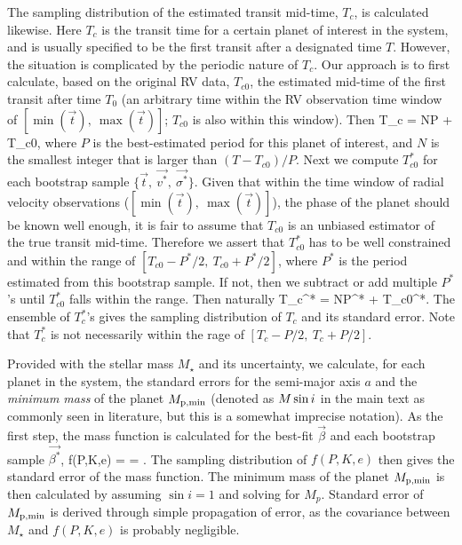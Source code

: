 The sampling distribution of the estimated transit mid-time, $T_c$, is
calculated likewise. Here $T_c$ is the transit time for a certain
planet of interest in the system, and is usually specified to be the first
transit after a designated time $T$.  However, the situation is
complicated by the periodic nature of $T_c$. Our approach is to first
calculate, based on the original RV data, $T_{c0}$, the estimated
mid-time of the first transit after time $T_0$ (an arbitrary time
within the RV observation time window of $[\min(\vec{t}),\ \max(\vec{t})]$; $T_{c0}$ 
is also within this window).
Then
\beq
T_c = N\cdot P + T_{c0},
\eeq
where $P$ is the best-estimated period for this planet of interest,
and $N$ is the smallest integer that is larger than $(T - T_{c0})/P$.
Next we compute $T_{c0}^*$ for each bootstrap sample $\lbrace
\vec{t},\ \vec{v^*},\ \vec{\sigma^*} \rbrace$. Given that within the
time window of radial velocity observations
($[\min(\vec{t}),\ \max(\vec{t})]$), the phase of the planet should be
known well enough, it is fair to assume that $T_{c0}$ is an unbiased
estimator of the true transit mid-time. Therefore we assert that
$T_{c0}^*$ has to be well constrained and within the range of
$[T_{c0}-P^*/2,\ T_{c0}+P^*/2]$, where $P^*$ is the period estimated from
this bootstrap sample. If not, then we subtract or add multiple
$P^*$'s until $T_{c0}^*$ falls within the range. Then naturally
\beq
T_c^* = N\cdot P^* + T_{c0}^*.
\eeq
The ensemble of $T_c^*$'s gives the sampling distribution of $T_c$
and its standard error. Note that $T_c^*$ is not necessarily within
the rage of $[T_{c}-P/2,\ T_{c}+P/2]$.

Provided with the stellar mass $M_\star$ and its uncertainty, we
calculate, for each planet in the system, the standard errors for the
semi-major axis $a$ and the {\it minimum mass} of the planet $M_{\rm
  p,min}$ (denoted as $M\sin{i}$ in the main text as commonly seen in
literature, but this is a somewhat imprecise notation). As the first
step, the mass function is calculated for the best-fit $\vec{\beta}$
and each bootstrap sample $\vec{\beta^*}$,
\beq
f(P,K,e) =  = .
\eeq
The sampling distribution of $f(P,K,e)$ then gives the standard error
of the mass function. The minimum mass of the planet $M_{\rm p,min}$ 
is then calculated by assuming $\sin{i}=1$ and solving for $M_p$.
Standard error of $M_{\rm p,min}$ is derived through simple
propagation of error, as the covariance between $M_\star$ and
$f(P,K,e)$ is probably negligible.

